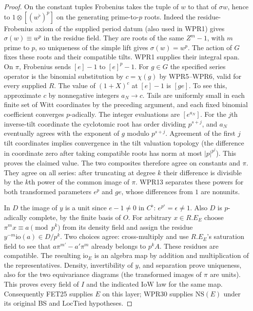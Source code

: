 \begin{proof}
On the constant tuples Frobenius takes the tuple of $w$ to that of
$\sigma w$, hence to $1\otimes[(w^\flat)^p]$ on the generating
prime-to-$p$ roots. Indeed the residue-Frobenius axiom of the supplied
period datum (also used in WPR1) gives $\sigma(w)\equiv w^p$ in the
residue field. They are roots of the same $Z^m-1$, with $m$ prime
to $p$, so uniqueness of the simple lift gives $\sigma(w)=w^p$.
The action of $G$ fixes these roots and their
compatible tilts. WPR1 supplies their integral span. On $\pi$,
Frobenius sends $[e]-1$ to $[e]^p-1$. For $g\in G$ the specified
series operator is the binomial substitution by $c=\chi(g)$ by
WPR5--WPR6, valid for every supplied $R$. The value of $(1+X)^c$
at $[e]-1$ is $[ge]$. To see this, approximate $c$ by nonnegative
integers $a_N\to c$. Tails are uniformly small in each finite set of
Witt coordinates by the preceding argument, and each fixed binomial
coefficient converges $p$-adically. The integer evaluations are
$[e^{a_N}]$. For the $j$th inverse-tilt coordinate the cyclotomic
root has order dividing $p^{s+j}$, and $a_N$ eventually agrees with
the exponent of $g$ modulo $p^{s+j}$. Agreement of the first $j$
tilt coordinates implies convergence in the tilt valuation topology
(the difference in coordinate zero after taking compatible roots
has norm at most $|p|^{p^j}$). This proves the claimed value.
The two composites therefore agree on constants and $\pi$. They
agree on all series: after truncating at degree $k$ their difference
is divisible by the $k$th power of the common image of $\pi$.
WPR13 separates these powers for both transformed parameters
$e^p$ and $ge$, whose differences from $1$ are nonunits.

In $D$ the image of $y$ is a unit since $e-1\ne0$ in $C^\flat$:
$e^{p^s}=\epsilon\ne1$. Also $D$ is $p$-adically complete,
by the finite basis of $O$. For arbitrary $x\in R.E_E$ choose
$\pi^m x\equiv a\pmod{p^k}$ from its density field and assign the
residue $y^{-m}\mathrm{io}(a)\in D/p^k$. Two choices agree:
cross-multiply and use $R.E_E$'s saturation field to see that
$a\pi^{m'}-a'\pi^m$ already belongs to $p^k A$. These residues are
compatible. The resulting $\mathrm{io}_E$ is an algebra map by
addition and multiplication of the representatives. Density,
invertibility of $y$, and separation prove uniqueness, also for the
two equivariance diagrams (the transformed images of $\pi$ are
units). This proves every field of $I$ and the indicated $\mathrm{IoW}$
law for the same map. Consequently FET25 supplies $E$ on this layer;
WPR30 supplies $\mathrm{NS}(E)$ under its original BS and
$\mathrm{LocTied}$ hypotheses.
\end{proof}

